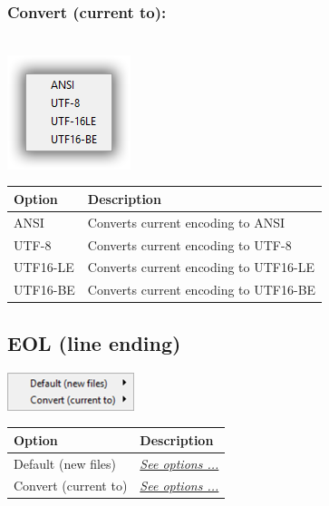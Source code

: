\hypertarget{menu_format_encoding_convert}{}
\subsubsection{Convert (current to):}\\

\includegraphics[scale=0.8]{./res/encoding.png}\\

\begin{scriptsize}
  \begin{tabularx}{\textwidth}{>{\hsize=0.3\hsize}X>{\hsize=0.7\hsize}X}\\
    \hline
    \textbf{Option} & \textbf{Description} \\
    \hline
    ANSI & Converts current encoding to ANSI \\
    UTF-8 & Converts current encoding to UTF-8 \\
    UTF16-LE & Converts current encoding to UTF16-LE \\
    UTF16-BE & Converts current encoding to UTF16-BE \\
    \hline
  \end{tabularx}
\end{scriptsize}


\hypertarget{menu_format_eol}{}
\subsection{EOL (line ending)}

\includegraphics[scale=0.8]{./res/menu_format_eol.png}\\

\begin{scriptsize}
  \begin{tabularx}{\textwidth}{>{\hsize=0.4\hsize}X>{\hsize=0.6\hsize}X}\\
    \hline
    \textbf{Option} & \textbf{Description} \\
    \hline
    Default (new files) & \textit{\href{\#menu\_format\_eol\_default}{See options ...}} \\
    Convert (current to) & \textit{\href{\#menu\_format\_eol\_convert}{See options ...}} \\
    \hline
  \end{tabularx}
\end{scriptsize}


